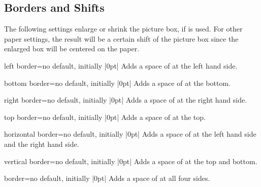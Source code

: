 \documentclass[a4paper,11pt]{ltxdoc}
\begin{document}
\clearpage
\subsection{Borders and Shifts}

The following settings enlarge or shrink the picture box, if
 is used. For other paper settings, the result
will be a certain shift of the picture box since the enlarged box
will be centered on the paper.

\begin{docIgrKey}[][doc new and updated={2015-03-12}{2024-03-08}]{left border}{=}{no default, initially |0pt|}
Adds a space of  at the left hand side.
\end{docIgrKey}

\begin{docIgrKey}[][doc new and updated={2015-03-12}{2024-03-08}]{bottom border}{=}{no default, initially |0pt|}
Adds a space of  at the bottom.
\end{docIgrKey}

\begin{docIgrKey}[][doc new and updated={2015-03-12}{2024-03-08}]{right border}{=}{no default, initially |0pt|}
Adds a space of  at the right hand side.
\end{docIgrKey}

\begin{docIgrKey}[][doc new and updated={2015-03-12}{2024-03-08}]{top border}{=}{no default, initially |0pt|}
Adds a space of  at the top.
\end{docIgrKey}

\begin{docIgrKey}[][doc new and updated={2015-03-12}{2024-03-08}]{horizontal border}{=}{no default, initially |0pt|}
Adds a space of  at the left hand side and the right hand side.
\end{docIgrKey}

\begin{docIgrKey}[][doc new and updated={2015-03-12}{2024-03-08}]{vertical border}{=}{no default, initially |0pt|}
Adds a space of  at the top and bottom.
\end{docIgrKey}

\begin{docIgrKey}[][doc new and updated={2015-03-12}{2024-03-08}]{border}{=}{no default, initially |0pt|}
Adds a space of  at all four sides.
\end{docIgrKey}
\end{document}
